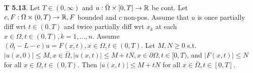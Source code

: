 {\bf T 5.13}. Let $T \in (0, \infty)$ and $u: \bar{\Omega} \times [0,T] \rightarrow \mathbb{R}$ be cont. Let $c, F: \Omega \times (0, T) \rightarrow \mathbb{R}, F$ bounded and $c$ non-pos. Assume that $u$ is once partially diff wrt $t \in (0, T)$ and twice partially diff wrt $x_k$ at each $x \in \Omega, t \in (0, T), k = 1, \dots, n$. Assume $(\partial_t - L - c)u = F(x,t), x \in \Omega, t \in (0,T)$. Let $M, N \geq 0$ s.t. $|u(x,0)| \leq M, x \in \bar{\Omega}, |u(x,t)|\leq M+tN, x \in \partial \Omega, t \in [0,T)$, and $|F(x,t)| \leq N$ for all $x \in \Omega, t \in (0, T)$. Then $|u(x,t)|\leq M+tN$ for all $x \in \bar{\Omega}, t \in [0, T]$. 
